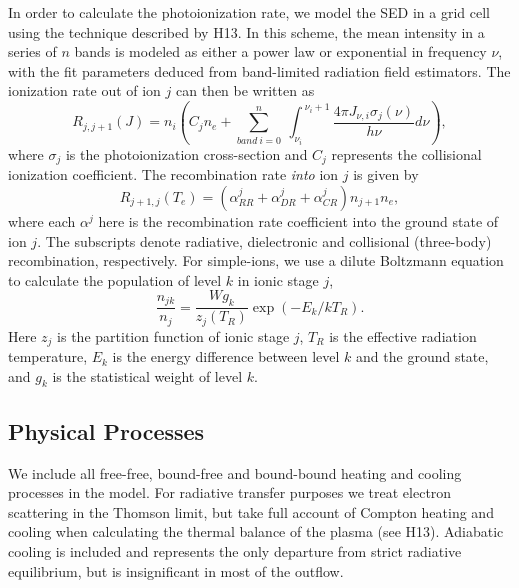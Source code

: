 \documentclass[useAMS,usenatbib]{mn2e_x}
\begin{document}
In order to calculate the photoionization rate, 
we model the SED in a grid cell using the technique described by H13. In this scheme,
the mean intensity in a series of $n$ bands is modeled as either a power law or exponential
in frequency $\nu$, with the fit parameters deduced from band-limited radiation field estimators.
The ionization rate out of ion $j$ can then be written as 
\begin{equation}
R_{j,j+1}(J)= 
\displaystyle{
n_i \left(C_{j} n_e + 
\sum_{band~i=0}^{n}~
{\int_{\nu_i}^{~\nu_i+1} \frac{4 \pi J_{\nu,i}\sigma_j(\nu)}  {h \nu} d\nu}
\right),}
\end{equation}
where $\sigma_j$ is the photoionization cross-section and $C_{j}$
represents the collisional ionization coefficient.
The recombination rate {\em into} ion $j$ is given by 
\begin{equation}
R_{j+1,j}(T_e) = (\alpha^j_{RR} + \alpha^j_{DR} + \alpha^j_{CR}) n_{j+1} n_e,
\end{equation}
where each $\alpha^j$ here is the recombination rate coefficient into the ground state of ion $j$.
The subscripts denote radiative, dielectronic and 
collisional (three-body) recombination, respectively.
For simple-ions, we use a dilute Boltzmann equation to calculate 
the population of level $k$ in ionic stage $j$,
\begin{equation}
\frac{n_{jk}}{n_j} = \frac{W g_k}{z_j(T_R)} \exp(-E_k/kT_R).
\end{equation}
Here $z_j$ is the partition function of ionic stage $j$,
$T_R$ is the effective radiation temperature,
$E_k$ is the energy difference between level $k$ and the ground state,
and $g_k$ is the statistical weight of level $k$. 

\subsection{Physical Processes}

We include all free-free, bound-free and bound-bound heating
and cooling processes in the model. For radiative transfer purposes
we treat electron scattering in the Thomson limit, 
but take full account of Compton heating and cooling when
calculating the thermal balance of the plasma (see H13).
Adiabatic cooling is included and represents the only
departure from strict radiative equilibrium, but is insignificant 
in most of the outflow.
\end{document}
